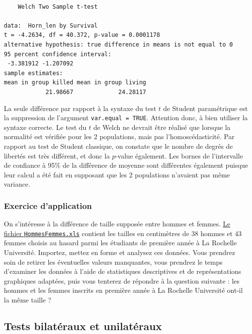 \documentclass[a4paperpaper,]{article}
\begin{document}
\begin{verbatim}

    Welch Two Sample t-test

data:  Horn_len by Survival
t = -4.2634, df = 40.372, p-value = 0.0001178
alternative hypothesis: true difference in means is not equal to 0
95 percent confidence interval:
 -3.381912 -1.207092
sample estimates:
mean in group killed mean in group living 
            21.98667             24.28117 
\end{verbatim}

La seule différence par rapport à la syntaxe du test \(t\) de Student paramétrique est la suppression de l'argument \texttt{var.equal\ =\ TRUE}. Attention donc, à bien utiliser la syntaxe correcte. Le test du \(t\) de Welch ne devrait être réalisé que lorsque la normalité est vérifiée pour les 2 populations, mais pas l'homoscédasticité. Par rapport au test de Student classique, on constate que le nombre de degrés de libertés est très différent, et donc la \(p\)-value également. Les bornes de l'intervalle de confiance à 95\% de la différence de moyenne sont différentes également puisque leur calcul a été fait en supposant que les 2 populations n'avaient pas même variance.

\hypertarget{exercice-dapplication-2}{%
\subsubsection{Exercice d'application}\label{exercice-dapplication-2}}

On s'intéresse à la différence de taille supposée entre hommes et femmes. \href{https://besibo.github.io/Biometrie3/data/HommesFemmes.xls}{Le fichier \texttt{HommesFemmes.xls}} contient les tailles en centimètres de 38 hommes et 43 femmes choisis au hasard parmi les étudiants de première année à La Rochelle Université. Importez, mettez en forme et analysez ces données. Vous prendrez soin de retirer les éventuelles valeurs manquantes, vous prendrez le temps d'examiner les données à l'aide de statistiques descriptives et de représentations graphiques adaptées, puis vous tenterez de répondre à la question suivante : les hommes et les femmes inscrits en première année à La Rochelle Université ont-il la même taille ?

\hypertarget{tests-bilatuxe9raux-et-unilatuxe9raux}{%
\subsection{Tests bilatéraux et unilatéraux}\label{tests-bilatuxe9raux-et-unilatuxe9raux}}
\end{document}
